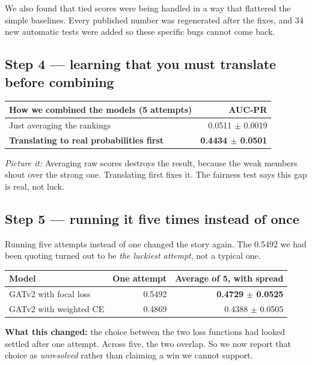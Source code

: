 \documentclass[11pt,a4paper]{article}
\newcommand{\pw}[1]{\textit{\textcolor{accent}{Picture it:}} #1}
\begin{document}
We also found that tied scores were being handled in a way that flattered the
simple baselines. Every published number was regenerated after the fixes, and 34
new automatic tests were added so these specific bugs cannot come back.

\subsection{Step 4 --- learning that you must translate before combining}

\begin{center}\small
\begin{tabular}{@{}lr@{}}
\toprule
\textbf{How we combined the models (5 attempts)} & \textbf{AUC-PR} \\
\midrule
Just averaging the rankings & 0.0511 $\pm$ 0.0019 \\
\textbf{Translating to real probabilities first} & \textbf{0.4434 $\pm$ 0.0501} \\
\bottomrule
\end{tabular}
\end{center}

\pw{Averaging raw scores destroys the result, because the weak members shout over
the strong one. Translating first fixes it.} The fairness test says this gap is
real, not luck.

\subsection{Step 5 --- running it five times instead of once}

Running five attempts instead of one changed the story again. The 0.5492 we had
been quoting turned out to be \emph{the luckiest attempt}, not a typical one.

\begin{center}\small
\begin{tabular}{@{}lrr@{}}
\toprule
\textbf{Model} & \textbf{One attempt} & \textbf{Average of 5, with spread} \\
\midrule
GATv2 with focal loss & 0.5492 & \textbf{0.4729 $\pm$ 0.0525} \\
GATv2 with weighted CE & 0.4869 & 0.4388 $\pm$ 0.0505 \\
\bottomrule
\end{tabular}
\end{center}

\textbf{What this changed:} the choice between the two loss functions had looked
settled after one attempt. Across five, the two overlap. So we now report that
choice as \emph{unresolved} rather than claiming a win we cannot support.
\end{document}
